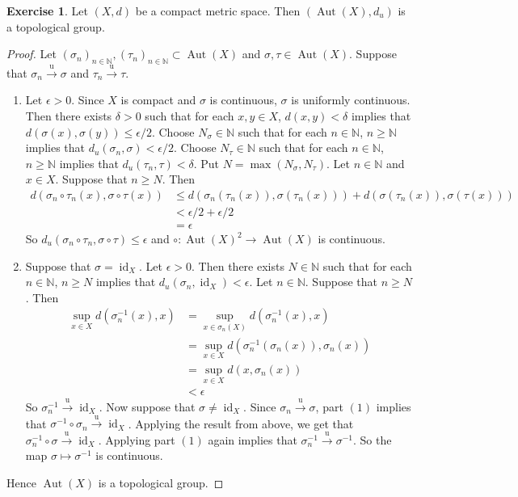 \documentclass[12pt]{amsart}
\theoremstyle{definition}
\newtheorem{ex}[definition]{Exercise}
\newcommand{\del}{\delta}
\newcommand{\ep}{\epsilon}
\newcommand{\sig}{\sigma}
\newcommand{\N}{\mathbb{N}}
\newcommand{\convt}[1]{\xrightarrow{\text{#1}}}
\DeclareMathOperator{\id}{id}
\DeclareMathOperator{\Aut}{Aut}
\newcommand{\lex}[1]{\label{ex:#1}}
\begin{document}
	\begin{ex} \lex{}
	Let $(X, d)$ be a compact metric space. Then $(\Aut(X), d_{u} )$ is a topological group.
	\end{ex}
	
	\begin{proof}
	Let $(\sig_n)_{n \in \N}, (\tau_n)_{n \in \N} \subset \Aut(X)$ and $\sig,\tau \in \Aut(X)$. Suppose that $\sig_n \convt{u} \sig$ and $\tau_n \convt{u} \tau$.
	\begin{enumerate}
	\item Let $\ep >0$. Since $X$ is compact and $\sig$ is continuous, $\sig$ is uniformly continuous. Then there exists $\del >0$ such that for each $x, y \in X$, $d(x,y) < \del$ implies that $d(\sig(x), \sig(y)) \leq \ep/2$.  Choose $N_\sig \in \N$ such that for each $n \in \N$, $ n \geq \N$ implies that $d_u(\sig_n, \sig) < \ep/2$. Choose $N_\tau \in \N$ such that for each $n \in \N$, $ n \geq \N$ implies that $d_u(\tau_n, \tau) < \del$. Put $N = \max(N_\sig, N_\tau)$. Let $n \in \N$ and $x \in X$. Suppose that $n \geq N$. Then 
	\begin{align*}
		d(\sig_n \circ \tau_n (x) ,\sig \circ \tau (x) ) 
		&\leq  d(\sig_n(\tau_n(x)),  \sig(\tau_n(x))) + d( \sig(\tau_n (x)), \sig( \tau (x))) \\
		& < \ep / 2 +\ep / 2 \\
		&= \ep 
	\end{align*}
	So $d_u(\sig_n \circ \tau_n, \sig\circ \tau) \leq \ep$ and $\circ: \Aut(X)^2 \rightarrow \Aut(X)$ is continuous. 
	\item Suppose that $\sig = \id_X$. Let $\ep >0$. Then there exists $N \in \N$ such that for each $n \in \N$, $n \geq N$ implies that $d_u(\sig_n, \id_X) < \ep$. Let $n \in \N$. Suppose that $n \geq N$. Then 
	\begin{align*}
	\sup_{x \in X} d(\sig^{-1}_n(x), x) 
	&= \sup_{x \in \sig_n(X)}d(\sig^{-1}_n(x), x) \\
	&= \sup_{x \in X}d(\sig^{-1}_n(\sig_n(x)), \sig_n(x)) \\
	&= \sup_{x \in X}d(x, \sig_n(x)) \\
	&< \ep
	\end{align*}
	So $\sig^{-1}_n \convt{u} \id_X$. Now suppose that $\sig \neq \id_X$. Since $\sig_n \convt{u} \sig$, part $(1)$ implies that $\sig^{-1} \circ \sig_n \convt{u} \id_X$. Applying the result from above, we get that $\sig_n^{-1} \circ \sig \convt{u} \id_X$. Applying part $(1)$ again implies that $\sig_n^{-1}  \convt{u}  \sig^{-1}$. So the map $\sig \mapsto \sig^{-1}$ is continuous. 
	\end{enumerate}
	Hence $\Aut(X)$ is a topological group. 
	\end{proof}
	
\end{document}
